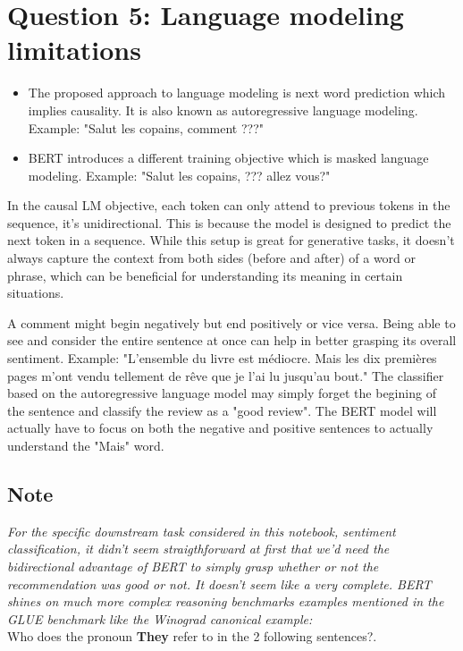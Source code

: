 \documentclass[a4paper]{article}
\begin{document}
\section{Question 5: Language modeling limitations}
\begin{itemize}
\item The proposed approach to language modeling is next word prediction which implies causality. It is also known as autoregressive language modeling.
Example: "Salut les copains, comment ???"
\item BERT \cite{devlin2019bert} introduces a different training objective which is masked language modeling. 
Example: "Salut les copains, ??? allez vous?"
\end{itemize}

In the causal LM objective, each token can only attend to previous tokens in the sequence, it's unidirectional. 
This is because the model is designed to predict the next token in a sequence. 
While this setup is great for generative tasks, it doesn't always capture the context from both sides (before and after) 
of a word or phrase, which can be beneficial for understanding its meaning in certain situations.

A comment might begin negatively but end positively or vice versa. Being able to see and consider the entire sentence at once can help in better grasping its overall sentiment.
Example: "L'ensemble du livre est médiocre. Mais les dix premières pages m'ont vendu tellement de rêve que je l'ai lu jusqu'au bout."
The classifier based on the autoregressive language model may simply forget the begining of the sentence and classify the review as a "good review".
The BERT model will actually have to focus on both the negative and positive sentences to actually understand the "Mais" word.

\subsection*{Note}
\textit{
For the specific downstream task considered in this notebook, sentiment classification, 
it didn't seem straigthforward at first that we'd need the bidirectional advantage
of BERT to simply grasp whether or not the recommendation was good or not. It doesn't seem like a very complete.
BERT\cite{devlin2019bert} shines on much more complex reasoning benchmarks examples mentioned in the GLUE \cite{wang2019glue} benchmark like
the Winograd canonical example:} \\
Who does the pronoun \textbf{They} refer to in the 2 following sentences?.
\end{document}
